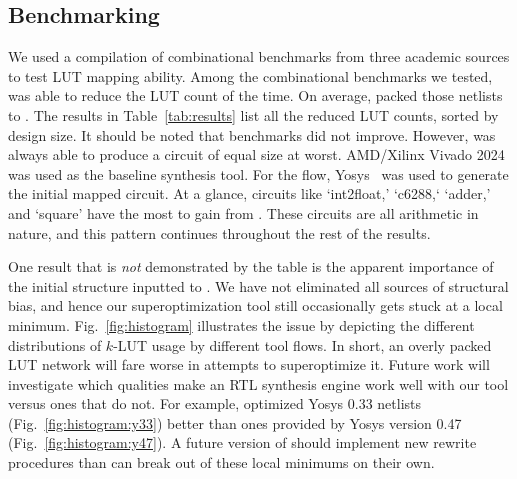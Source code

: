 \subsection{Benchmarking}\label{sec:results:benchmark}

We used a compilation of \nbenchmarks{} combinational benchmarks from three
academic sources to test LUT mapping ability. Among the combinational
benchmarks we tested, \shortname{} was able to reduce the LUT count \fmetric{}
of the time. On average, \shortname{} packed those netlists to \metric{}. The
results in Table~\ref{tab:results} list all the reduced LUT counts, sorted by
design size. It should be noted that \nnotimproved{} benchmarks did not
improve. However, \shortname{} was always able to produce a circuit of equal
size at worst. AMD/Xilinx Vivado 2024~\cite{vivado} was used as the baseline
synthesis tool. For the \shortname{} flow, Yosys~\cite{yosys} was used to
generate the initial mapped circuit. At a glance, circuits like `int2float,'
`c6288,` `adder,' and `square' have the most to gain from \shortname{}. These
circuits are all arithmetic in nature, and this pattern continues throughout
the rest of the results.

One result that is \textit{not} demonstrated by the table is the apparent
importance of the initial structure inputted to \shortname{}. We have not
eliminated all sources of structural bias, and hence our superoptimization tool
still occasionally gets stuck at a local minimum. Fig.~\ref{fig:histogram}
illustrates the issue by depicting the different distributions of $k$-LUT usage
by different tool flows. In short, an overly packed LUT network will fare worse
in attempts to superoptimize it. Future work will investigate which qualities
make an RTL synthesis engine work well with our tool versus ones that do not.
For example, \shortname{} optimized Yosys 0.33 netlists
(Fig.~\ref{fig:histogram:y33}) better than ones provided by Yosys version 0.47
(Fig.~\ref{fig:histogram:y47}). A future version of \shortname{} should
implement new rewrite procedures than can break out of these local minimums on
their own.

